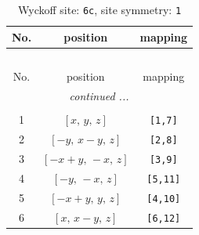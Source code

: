 \documentclass[fleqn,8pt]{jsarticle}
\begin{document}
\begin{longtable}{ccc}
\caption{Wyckoff site: {\tt 6c}, site symmetry: {\tt 1}}
 \\
 \hline \hline
No. & position & mapping \\ \hline \endfirsthead

\multicolumn{2}{l}{\tablename\ \thetable{}} \\
 \hline \hline
No. & position & mapping \\ \hline \endhead

 \hline \hline
\multicolumn{2}{r}{\footnotesize\it continued ...} \\ \endfoot

 \hline \hline
\multicolumn{2}{r}{} \\ \endlastfoot

1 & $\left[ x,\, y,\, z \right]$ & {\tt [1,7]} \\ \hline
2 & $\left[ - y,\, x - y,\, z \right]$ & {\tt [2,8]} \\ \hline
3 & $\left[ - x + y,\, - x,\, z \right]$ & {\tt [3,9]} \\ \hline
4 & $\left[ - y,\, - x,\, z \right]$ & {\tt [5,11]} \\ \hline
5 & $\left[ - x + y,\, y,\, z \right]$ & {\tt [4,10]} \\ \hline
6 & $\left[ x,\, x - y,\, z \right]$ & {\tt [6,12]} \\
\end{longtable}
\end{document}

